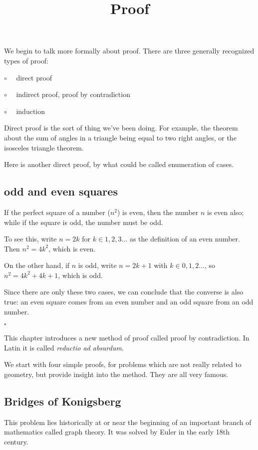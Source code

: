 \documentclass[11pt, oneside]{article}
\title{Proof}
\date{}
\begin{document}
\maketitle
\Large


We begin to talk more formally about proof.  There are three generally recognized types of proof:

$\circ$ \ \ direct proof

$\circ$ \ \ indirect proof, proof by contradiction

$\circ$ \ \ induction

Direct proof is the sort of thing we've been doing.  For example, the theorem about the sum of angles in a triangle being equal to two right angles, or the isosceles triangle theorem.

Here is another direct proof, by what could be called enumeration of cases.

\subsection*{odd and even squares}

If the perfect square of a number ($n^2$) is even, then the number $n$ is even also;  while if the square is odd, the number must be odd.

To see this, write $n = 2k$ for $k \in 1,2,3 \dots$ as the definition of an even number.  Then $n^2 = 4k^2$, which is even.  

On the other hand, if $n$ is odd, write $n = 2k + 1$ with $k \in 0, 1, 2 \dots$, so $n^2 = 4k^2 + 4k + 1$, which is odd.  

Since there are only these two cases, we can conclude that the converse is also true:  an even square comes from an even number and an odd square from an odd number.

$\square$

This chapter introduces a new method of proof called proof by contradiction.  In Latin it is called \emph{reductio ad absurdum}.  

We start with four simple proofs, for problems which are not really related to geometry, but provide insight into the method.  They are all very famous.  

\subsection*{Bridges of Konigsberg}

This problem lies historically at or near the beginning of an important branch of mathematics called graph theory.  It was solved by Euler in the early 18th century.  
\end{document}
